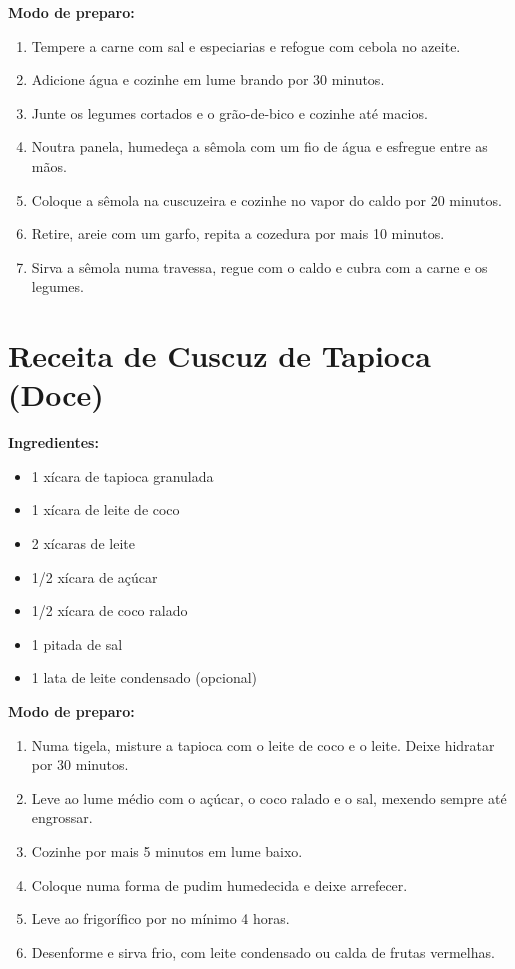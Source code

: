 \documentclass[12pt,a4paper,openright]{book}
\begin{document}
\textbf{Modo de preparo:}
\begin{enumerate}
    \item Tempere a carne com sal e especiarias e refogue com cebola no azeite.
    \item Adicione água e cozinhe em lume brando por 30 minutos.
    \item Junte os legumes cortados e o grão-de-bico e cozinhe até macios.
    \item Noutra panela, humedeça a sêmola com um fio de água e esfregue entre as mãos.
    \item Coloque a sêmola na cuscuzeira e cozinhe no vapor do caldo por 20 minutos.
    \item Retire, areie com um garfo, repita a cozedura por mais 10 minutos.
    \item Sirva a sêmola numa travessa, regue com o caldo e cubra com a carne e os legumes.
\end{enumerate}

\section{Receita de Cuscuz de Tapioca (Doce)}

\textbf{Ingredientes:}
\begin{itemize}
    \item 1 xícara de tapioca granulada
    \item 1 xícara de leite de coco
    \item 2 xícaras de leite
    \item 1/2 xícara de açúcar
    \item 1/2 xícara de coco ralado
    \item 1 pitada de sal
    \item 1 lata de leite condensado (opcional)
\end{itemize}

\textbf{Modo de preparo:}
\begin{enumerate}
    \item Numa tigela, misture a tapioca com o leite de coco e o leite. Deixe hidratar por 30 minutos.
    \item Leve ao lume médio com o açúcar, o coco ralado e o sal, mexendo sempre até engrossar.
    \item Cozinhe por mais 5 minutos em lume baixo.
    \item Coloque numa forma de pudim humedecida e deixe arrefecer.
    \item Leve ao frigorífico por no mínimo 4 horas.
    \item Desenforme e sirva frio, com leite condensado ou calda de frutas vermelhas.
\end{enumerate}
\end{document}
